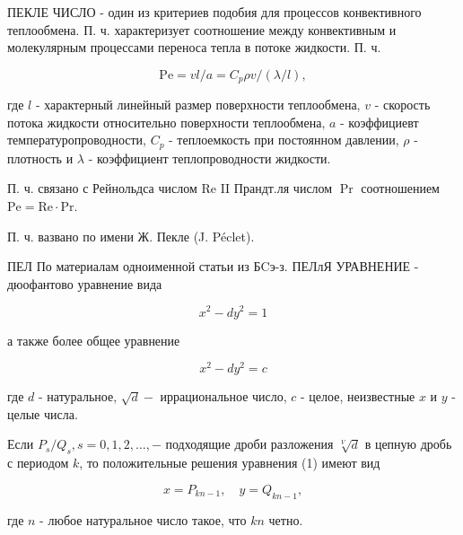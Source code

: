 \documentclass[10pt]{article}
\begin{document}
ПЕКЛЕ ЧИСЛО - один из критериев подобия для процессов конвективного теплообмена. П. ч. характеризует соотношение между конвективным и молекулярным процессами переноса тепла в потоке жидкости. П. ч.



\[

\mathrm{Pe}=v l / a=C_{p} \rho v /(\lambda / l),

\]



где $l$ - характерный линейный размер поверхности теплообмена, $v$ - скорость потока жидкости относительно поверхности теплообмена, $a$ - коэффициевт температуропроводности, $C_{p}$ - теплоемкость при постоянном давлении, $\rho$ - плотность и $\lambda$ - коэффициент теплопроводности жидкости.



П. ч. связано с Рейнольдса числом Re II Прандт.ля числом $\operatorname{Pr}$ соотношением $\mathrm{Pe}=\mathrm{Re} \cdot \mathrm{Pr}$.



П. ч. вазвано по имени Ж. Пекле (J. Péclet).



ПЕЛ По материалам одноименной статьи из БCэ-з. ПЕЛлЯ УРАВНЕНИЕ - дюофантово уравнение вида



\[

x^{2}-d y^{2}=1

\]



а также более общее уравнение



\[

x^{2}-d y^{2}=c

\]



где $d$ - натуральное, $\sqrt{d}-$ иррациональное число, $c$ - целое, неизвестные $x$ и $y$ - целые числа.



Если $P_{s} / Q_{s}, s=0,1,2, \ldots,-$ подходящие дроби разложения $\sqrt[V]{d}$ в цепную дробь с периодом $k$, то положительные решения уравнения (1) имеют вид



\[

x=P_{k n-1}, \quad y=Q_{k n-1},

\]



где $n$ - любое натуральное число такое, что $k n$ четно.
\end{document}
